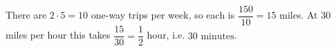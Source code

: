 There are $2\cdot5=10$ one-way trips per week, so each is $\dfrac{150}{10}=15$ miles. At $30$ miles per hour this takes $\dfrac{15}{30}=\dfrac12$ hour, i.e. $\boxed{30\text{ minutes}}$.
